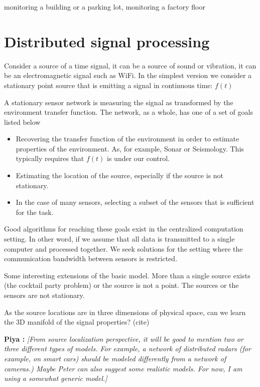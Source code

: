 \documentclass{article}
\newcommand{\comment}[3]{{\color{#1} {\bf #2 :} #3}}
\newcommand{\piya}[1]{\comment{blue}{Piya}{#1}}
\begin{document}
 
 
 monitoring a building or a parking lot, monitoring a factory floor

\section{Distributed signal processing}

Consider a source of a time signal, it can be a source of sound or vibration, it can be an electromagnetic signal such as WiFi. In the simplest version we consider a stationary point source that is emitting a signal in continuous time: $f(t)$

A stationary sensor network is measuring the signal as transformed by the environment transfer function. The network, as a whole, has one of a set of goals listed below

\begin{itemize}
    \item Recovering the transfer function of the environment in order to estimate properties of the environment. As, for example, Sonar or Seismology. This typically requires that $f(t)$ is under our control.
    \item Estimating the location of the source, especially if the source is not stationary.
    \item In the case of many sensors, selecting a subset of the sensors that is sufficient for the task.
\end{itemize}

Good algorithms for reaching these goals exist in the centralized computation setting. In other word, if we assume that all data is  transmitted to a single computer and processed together. We seek solutions for the setting where the communication bandwidth between sensors is restricted.

Some interesting extensions of the basic model. More than a single source exists (the cocktail party problem) or the source is not a point. The sources or the sensors are not stationary. 

As the source locations are in three dimensions of physical space, can we learn the 3D manifold of the signal properties? (cite)


\piya{\em [From source localization perspective, it will be good to mention two or three different types of models. For example, a network of distributed radars (for example, on smart cars) should be modeled differently from a network of cameras.) Maybe Peter can also suggest some realistic models. For now, I am using a somewhat generic model.]}
\end{document}
